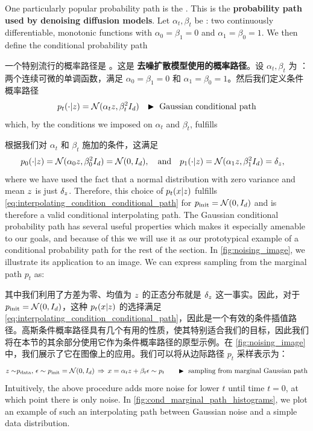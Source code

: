 \begin{examplebox}
\label{example:gaussian_path}
    One particularly popular probability path is the . This is the \textbf{probability path used by denoising diffusion models}. Let $\alpha_t,\beta_t$ be : two continuously differentiable, monotonic functions with $\alpha_0=\beta_1=0$ and $\alpha_1=\beta_0=1$. We then define the conditional probability path

    一个特别流行的概率路径是 。这是 \textbf{去噪扩散模型使用的概率路径}。设 $\alpha_t,\beta_t$ 为 ：两个连续可微的单调函数，满足 $\alpha_0=\beta_1=0$ 和 $\alpha_1=\beta_0=1$。然后我们定义条件概率路径
\begin{align}
\label{eq:gaussian_conditional_probability_paths}
p_t(\cdot|z) &= \mathcal{N}(\alpha_t z,\beta_t^2 I_d)
& \blacktriangleright \,\, \text{Gaussian conditional path}
\end{align}
which, by the conditions we imposed on $\alpha_t$ and $\beta_t$, fulfills

根据我们对 $\alpha_t$ 和 $\beta_t$ 施加的条件，这满足
\begin{align*}
    p_0(\cdot|z) &= \mathcal{N}(\alpha_0 z,\beta_0^2 I_d) = \mathcal{N}(0,I_d),\quad \text{and}\quad
p_1(\cdot|z) = \mathcal{N}(\alpha_1 z,\beta_1^2 I_d) = \delta_{z},
\end{align*}
where we have used the fact that a normal distribution with zero variance and mean $z$ is just $\delta_{z}$. Therefore, this choice of $p_t(x|z)$ fulfills \cref{eq:interpolating_condition_conditional_path} for $p_{\rm{init}}=\mathcal{N}(0,I_d)$ and is therefore a valid conditional interpolating path. The Gaussian conditional probability path has several useful properties which makes it especially amenable to our goals, and because of this we will use it as our prototypical example of a conditional probability path for the rest of the section. In \cref{fig:noising_image}, we illustrate its application to an image. We can express sampling from the marginal path $p_t$ as:

其中我们利用了方差为零、均值为 $z$ 的正态分布就是 $\delta_{z}$ 这一事实。因此，对于 $p_{\rm{init}}=\mathcal{N}(0,I_d)$，这种 $p_t(x|z)$ 的选择满足 \cref{eq:interpolating_condition_conditional_path}，因此是一个有效的条件插值路径。高斯条件概率路径具有几个有用的性质，使其特别适合我们的目标，因此我们将在本节的其余部分使用它作为条件概率路径的原型示例。在 \cref{fig:noising_image} 中，我们展示了它在图像上的应用。我们可以将从边际路径 $p_t$ 采样表示为： 
\begin{align}
    \label{eq:gaussian_prob_path_sampling}
    z\sim&p_{\rm{data}},\,\epsilon\sim p_{\rm{init}} = \mathcal{N}(0,I_d) \,\Rightarrow\, x=\alpha_tz+\beta_t \epsilon\sim p_t \quad &\blacktriangleright \,\,\text{sampling from marginal Gaussian path}
\end{align}
Intuitively, the above procedure adds more noise for lower $t$ until time $t=0$, at which point there is only noise. In \cref{fig:cond_marginal_path_histograms}, we plot an example of such an interpolating path between Gaussian noise and a simple data distribution.


\end{examplebox}
